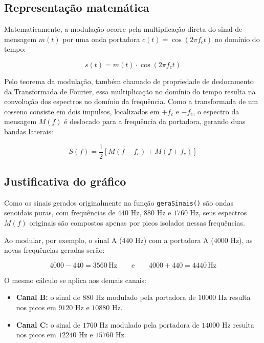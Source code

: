 \documentclass[12pt,a4paper]{article}
\begin{document}
\subsection*{Representação matemática}

Matematicamente, a modulação ocorre pela multiplicação direta do sinal de mensagem $m(t)$ por uma onda portadora $c(t) = \cos(2\pi f_c t)$ no domínio do tempo:

\begin{equation}
    s(t) = m(t) \cdot \cos(2\pi f_c t)
\end{equation}

Pelo teorema da modulação, também chamado de propriedade de deslocamento da Transformada de Fourier, essa multiplicação no domínio do tempo resulta na convolução dos espectros no domínio da frequência. Como a transformada de um cosseno consiste em dois impulsos, localizados em $+f_c$ e $-f_c$, o espectro da mensagem $M(f)$ é deslocado para a frequência da portadora, gerando duas bandas laterais:

\begin{equation}
    S(f) = \frac{1}{2} \left[ M(f - f_c) + M(f + f_c) \right]
\end{equation}

\subsection*{Justificativa do gráfico}

Como os sinais gerados originalmente na função \texttt{geraSinais()} são ondas senoidais puras, com frequências de $440$ Hz, $880$ Hz e $1760$ Hz, seus espectros $M(f)$ originais são compostos apenas por picos isolados nessas frequências.

Ao modular, por exemplo, o sinal A ($440$ Hz) com a portadora A ($4000$ Hz), as novas frequências geradas serão:

\[
    4000 - 440 = 3560\,\text{Hz}
    \qquad \text{e} \qquad
    4000 + 440 = 4440\,\text{Hz}
\]

O mesmo cálculo se aplica aos demais canais:

\begin{itemize}
    \item \textbf{Canal B:} o sinal de $880$ Hz modulado pela portadora de $10000$ Hz resulta nos picos em $9120$ Hz e $10880$ Hz.
    \item \textbf{Canal C:} o sinal de $1760$ Hz modulado pela portadora de $14000$ Hz resulta nos picos em $12240$ Hz e $15760$ Hz.
\end{itemize}
\end{document}
